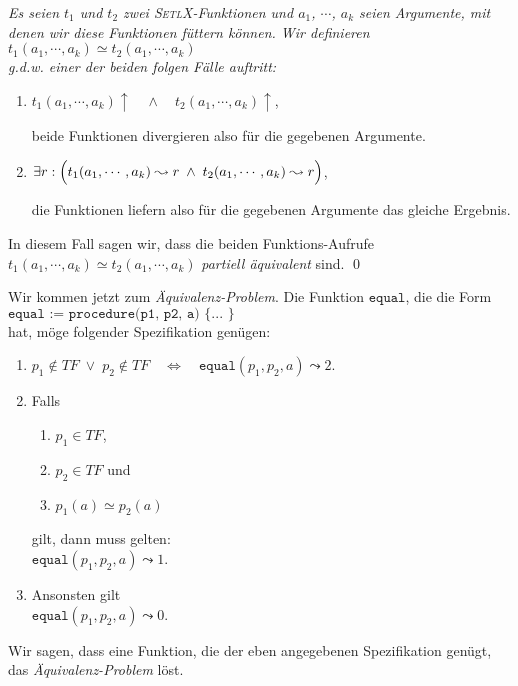 \begin{Definition}[$\simeq$] 
{\em 
Es seien $t_1$ und $t_2$ zwei \textsc{SetlX}-Funktionen und
  $a_1$, $\cdots$, $a_k$ seien Argumente, mit denen wir diese Funktionen füttern können. Wir definieren \\[0.1cm]
\hspace*{1.3cm} $t_1(a_1,\cdots,a_k) \simeq t_2(a_1,\cdots,a_k)$ \\[0.1cm]
g.d.w. einer der beiden folgen Fälle auftritt:
\begin{enumerate}
\item $t_1(a_1,\cdots,a_k)\uparrow \quad\wedge\quad t_2(a_1,\cdots,a_k)\uparrow$,

      beide Funktionen divergieren also für die gegebenen Argumente.
\item $\exists r: \Bigl(t_1(a_1,\cdots,a_k) \leadsto r \;\wedge\; t_2(a_1,\cdots,a_k) \leadsto r\Bigr)$,

      die Funktionen liefern also für die gegebenen Argumente das gleiche Ergebnis.
\end{enumerate}
      In diesem Fall sagen wir, dass die beiden Funktions-Aufrufe 
      $t_1(a_1,\cdots,a_k) \simeq t_2(a_1,\cdots,a_k)$ \emph{partiell äquivalent} sind.  
      \qed
}
\end{Definition}

\noindent
Wir kommen jetzt zum \emph{Äquivalenz-Problem}.  Die Funktion $\texttt{equal}$, die die Form
\\[0.2cm]
\hspace*{1.3cm}
$\texttt{equal := procedure(p1, p2, a) \{ ... \}}$
\\[0.2cm]
hat, möge folgender Spezifikation genügen:
\begin{enumerate}
\item $p_1 \not\in T\!F \;\vee\; p_2 \not\in T\!F \quad\Leftrightarrow\quad \mathtt{equal}(p_1, p_2, a) \leadsto 2$.
\item Falls 
  \begin{enumerate}
  \item $p_1 \in T\!F$,
  \item $p_2 \in T\!F$ \quad und
  \item $p_1(a) \simeq p_2(a)$
  \end{enumerate}
    gilt, dann muss gelten: \\[0.1cm]
   \hspace*{1.3cm}  $\mathtt{equal}(p_1, p_2, a) \leadsto 1$.
\item Ansonsten gilt \\[0.1cm]
      \hspace*{1.3cm} $\mathtt{equal}(p_1, p_2, a) \leadsto 0$.
\end{enumerate}
Wir sagen, dass eine Funktion, die der eben angegebenen Spezifikation genügt, das
\emph{Äquivalenz-Problem} löst.

